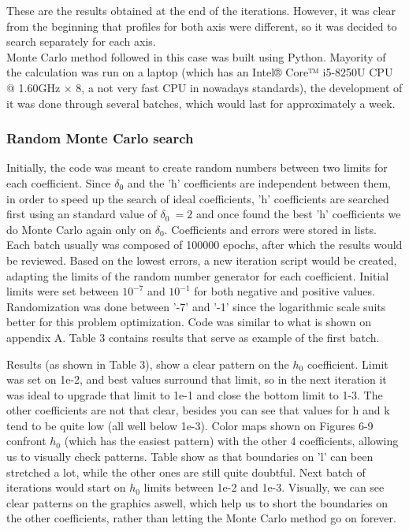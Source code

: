 \documentclass[openany]{article}
\begin{document}
These are the results obtained at the end of the iterations. However, it was clear from the beginning that profiles for both axis were different, so it was decided to search separately for each axis. \\
Monte Carlo method followed in this case was built using Python. Mayority of the calculation was run on a laptop (which has an Intel® Core™ i5-8250U CPU @ 1.60GHz × 8, a not very fast CPU in nowadays standards), the development of it was done through several batches, which would last for approximately a week.

\subsubsection{Random Monte Carlo search}

Initially, the code was meant to create random numbers between two limits for each coefficient. Since \(\delta_0\) and the 'h' coefficients are independent between them, in order to speed up the search of ideal coefficients, 'h' coefficients are searched first using an standard value of \(\delta_0\ =2\) and once found the best 'h' coefficients we do Monte Carlo again only on \(\delta_0\). Coefficients and errors were stored in lists. Each batch usually was composed of 100000 epochs, after which the results would be reviewed. Based on the lowest errors, a new iteration script would be created, adapting the limits of the random number generator for each coefficient. Initial limits were set between \(10^{-7}\) and \(10^{-1}\) for both negative and positive values. Randomization was done between '-7' and '-1' since the logarithmic scale suits better for this problem optimization. Code was similar to what is shown on appendix A. Table 3 contains results that serve as example of the first batch. 

\newpage 


Results (as shown in Table 3), show a clear pattern on the \(h_0\) coefficient. Limit was set on 1e-2, and best values surround that limit, so in the next iteration it was ideal to upgrade that limit to 1e-1 and close the bottom limit to 1-3. The other coefficients are not that clear, besides you can see that values for h and k tend to be quite low (all well below 1e-3). Color maps shown on Figures 6-9 confront \(h_0\) (which has the easiest pattern) with the other 4 coefficients, allowing us to visually check patterns. Table show as that boundaries on 'l' can been stretched a lot, while the other ones are still quite doubtful. Next batch of iterations would start on \(h_0\) limits between 1e-2 and 1e-3. Visually, we can see clear patterns on the graphics aswell, which help us to short the boundaries on the other coefficients, rather than letting the Monte Carlo method go on forever.
\end{document}
